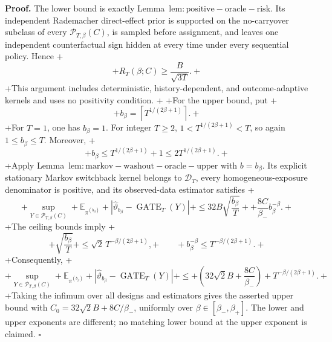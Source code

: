 \textbf{Proof.} The lower bound is exactly Lemma~\(\mathrm{lem:positive-oracle-risk}\). Its independent Rademacher direct-effect prior is supported on the no-carryover subclass of every \(\mathcal P_{T,\beta}(C)\), is sampled before assignment, and leaves one independent counterfactual sign hidden at every time under every sequential policy. Hence
+\[
+R_T(\beta;C)\ge \frac{B}{\sqrt{3T}}.
+\]
+This argument includes deterministic, history-dependent, and outcome-adaptive kernels and uses no positivity condition.
+
+For the upper bound, put
+\[
+b_\beta=\left\lceil T^{1/(2\beta+1)}\right\rceil.
+\]
+For \(T=1\), one has \(b_\beta=1\). For integer \(T\ge2\), \(1<T^{1/(2\beta+1)}<T\), so again \(1\le b_\beta\le T\). Moreover,
+\[
+b_\beta\le T^{1/(2\beta+1)}+1\le2T^{1/(2\beta+1)}.
+\]
+Apply Lemma~\(\mathrm{lem:markov-washout-oracle-upper}\) with \(b=b_\beta\). Its explicit stationary Markov switchback kernel belongs to \(\mathcal D_T\), every homogeneous-exposure denominator is positive, and its observed-data estimator satisfies
+\[
+\sup_{Y\in\mathcal P_{T,\beta}(C)}
+\mathbb E_{\pi^{(b_\beta)}}
+\left|\widehat\vartheta_{b_\beta}-\operatorname{GATE}_T(Y)\right|
+\le 32B\sqrt{\frac{b_\beta}{T}}
++\frac{8C}{\beta_-}b_\beta^{-\beta}.
+\]
+The ceiling bounds imply
+\[
+\sqrt{\frac{b_\beta}{T}}
+\le\sqrt2\,T^{-\beta/(2\beta+1)},
+\qquad
+b_\beta^{-\beta}\le T^{-\beta/(2\beta+1)}.
+\]
+Consequently,
+\[
+\sup_{Y\in\mathcal P_{T,\beta}(C)}
+\mathbb E_{\pi^{(b_\beta)}}
+\left|\widehat\vartheta_{b_\beta}-\operatorname{GATE}_T(Y)\right|
+\le
+\left(32\sqrt2 B+\frac{8C}{\beta_-}\right)
+T^{-\beta/(2\beta+1)}.
+\]
+Taking the infimum over all designs and estimators gives the asserted upper bound with \(C_0=32\sqrt2 B+8C/\beta_-\), uniformly over \(\beta\in[\beta_-,\beta_+]\). The lower and upper exponents are different; no matching lower bound at the upper exponent is claimed. \(\square\)